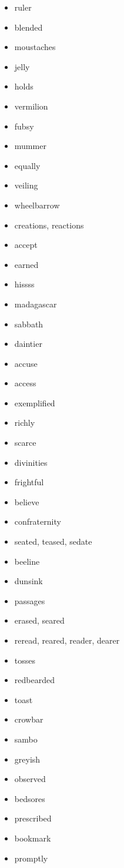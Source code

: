 \documentclass{article}
\begin{document}
\begin{itemize}
    \item ruler
    \item blended
    \item moustaches
    \item jelly
    \item holds
    \item vermilion
    \item fubsy
    \item mummer
    \item equally
    \item veiling
    \item wheelbarrow
    \item creations, reactions
    \item accept
    \item earned
    \item hissss
    \item madagascar
    \item sabbath
    \item daintier
    \item accuse
    \item access
    \item exemplified
    \item richly
    \item scarce
    \item divinities
    \item frightful
    \item believe
    \item confraternity
    \item seated, teased, sedate
    \item beeline
    \item dunsink
    \item passages
    \item erased, seared
    \item reread, reared, reader, dearer
    \item tosses
    \item redbearded
    \item toast
    \item crowbar
    \item sambo
    \item greyish
    \item observed
    \item bedsores
    \item prescribed
    \item bookmark
    \item promptly

\end{itemize}
\end{document}
